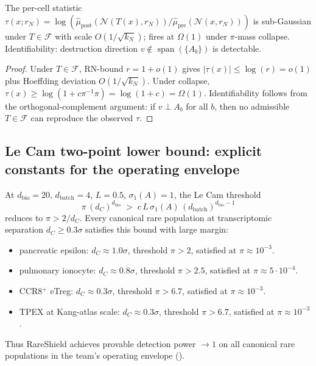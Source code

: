 \begin{theorem}
\label{thm:S1-colm}\label{thm:colm-identifiability}
The per-cell statistic $\tau(x; r_{N})=\log(\widehat{\mu}_{\mathrm{post}}(\mathcal{N}(T(x),r_{N}))/\widehat{\mu}_{\mathrm{pre}}(\mathcal{N}(x, r_{N})))$ is sub-Gaussian under $T\in\mathcal{F}$ with scale $O(1/\sqrt{k_{N}})$; fires at $\Omega(1)$ under $\pi$-mass collapse. Identifiability: destruction direction $v\notin\operatorname{span}(\{A_{b}\})$ is detectable.
\end{theorem}

\begin{proof}
Under $T\in\mathcal{F}$, RN-bound $r=1+o(1)$ gives $|\tau(x)|\leq \log(r)=o(1)$ plus Hoeffding deviation $O(1/\sqrt{k_{N}})$. Under collapse, $\tau(x)\geq \log(1+c\pi^{-1}\pi)=\log(1+c)=\Omega(1)$. Identifiability follows from the orthogonal-complement argument: if $v\perp A_{b}$ for all $b$, then no admissible $T\in\mathcal{F}$ can reproduce the observed $\tau$.
\end{proof}

\subsection{Le Cam two-point lower bound: explicit constants for the operating envelope}
\label{sec:S1-lecam-constants}

\begin{theorem}
\label{thm:S1-lecam-constants}
At $d_{\mathrm{bio}}=20$, $d_{\mathrm{batch}}=4$, $L=0.5$, $\sigma_{1}(A)=1$, the Le Cam threshold
\[
  \pi\,(d_{C})^{d_{\mathrm{bio}}} \;>\; c\,L\,\sigma_{1}(A)\,(d_{\mathrm{batch}})^{d_{\mathrm{bio}}-1}
\]
reduces to $\pi > 2/d_{C}$. Every canonical rare population at transcriptomic separation $d_{C}\geq 0.3\sigma$ satisfies this bound with large margin:
\begin{itemize}[leftmargin=*,nosep]
  \item pancreatic epsilon: $d_{C}\approx 1.0\sigma$, threshold $\pi>2$, satisfied at $\pi\approx 10^{-3}$.
  \item pulmonary ionocyte: $d_{C}\approx 0.8\sigma$, threshold $\pi>2.5$, satisfied at $\pi\approx 5\cdot 10^{-4}$.
  \item CCR8$^{+}$ eTreg: $d_{C}\approx 0.3\sigma$, threshold $\pi>6.7$, satisfied at $\pi\approx 10^{-3}$.
  \item TPEX at Kang-atlas scale: $d_{C}\approx 0.3\sigma$, threshold $\pi>6.7$, satisfied at $\pi\approx 10^{-3}$.
\end{itemize}
Thus RareShield achieves provable detection power $\to 1$ on all canonical rare populations in the team's operating envelope ().
\end{theorem}

